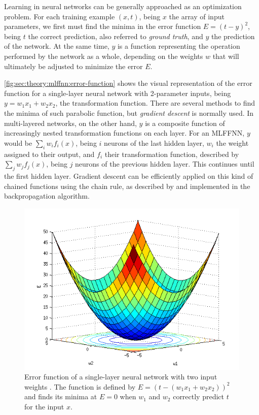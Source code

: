 Learning in neural networks can be generally approached as an optimization problem.
For each training example $(x, t)$, being $x$ the array of input parameters, we first must find the minima in the error function $E = (t - y)^2$, being $t$ the correct prediction, also referred to \emph{ground truth}, and $y$ the prediction of the network.
At the same time, $y$ is a function representing the operation performed by the network as a whole, depending on the weights $w$ that will ultimately be adjusted to minimize the error $E$.

\autoref{fig:sec:theory:mlffnn:error-function} shows the visual representation of the error function for a single-layer neural network with 2-parameter inputs, being $y = w_1 x_1 + w_2 x_2$, the transformation function.
There are several methods to find the minima of such parabolic function, but \emph{gradient descent} is normally used.
In multi-layered networks, on the other hand, $y$ is a composite function of increasingly nested transformation functions on each layer.
For an MLFFNN, $y$ would be $\sum_i w_i f_i(x)$, being $i$ neurons of the last hidden layer, $w_i$ the weight assigned to their output, and $f_i$ their transformation function, described by $\sum_j w_j f_j(x)$, being $j$ neurons of the previous hidden layer.
This continues until the first hidden layer.
Gradient descent can be efficiently applied on this kind of chained functions using the chain rule, as described by \citet{Linnainmaa1976} and implemented in the backpropagation algorithm.

\begin{figure}[htb]
  \includegraphics[width=\textwidth]{gfx/error-function}
  \caption{
    Error function of a single-layer neural network with two input weights \cite{AI4562013}.
    The function is defined by $E = (t - (w_1 x_1 + w_2 x_2))^2$ and finds its minima at $E = 0$ when $w_1$ and $w_2$ correctly predict $t$ for the input $x$.
  }
  \label{fig:sec:theory:mlffnn:error-function}
\end{figure}

